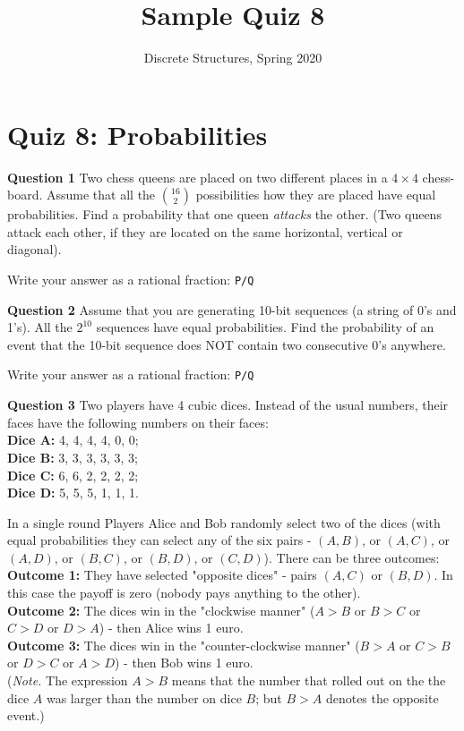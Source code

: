 \documentclass[jou]{apa6}
\title{Sample Quiz 8}
\author{Discrete Structures, Spring 2020}
\affiliation{RBS}
\begin{document}

\twocolumn
\section{Quiz 8: Probabilities}

\vspace{10pt}
{\bf Question 1} 
Two chess queens are placed on two different places in a $4 \times 4$ chess-board.
Assume that all the ${16 \choose 2}$ possibilities how they are placed have equal probabilities.
Find a probability that one queen {\em attacks} the other. (Two queens attack each other, if
they are located on the same horizontal, vertical or diagonal).

Write your answer as a rational fraction: {\tt P/Q}

\vspace{10pt}
{\bf Question 2} Assume that you are generating 10-bit sequences (a string of 0's and 1's). 
All the $2^{10}$ sequences have equal probabilities. 
Find the probability of an event that the 10-bit sequence does NOT contain two consecutive 0's anywhere.

Write your answer as a rational fraction: {\tt P/Q}

\vspace{10pt}
{\bf Question 3}
Two players have 4 cubic dices. Instead of the usual numbers, their faces have the following numbers on their faces:\\
{\bf Dice A:} 4, 4, 4, 4, 0, 0;\\
{\bf Dice B:} 3, 3, 3, 3, 3, 3;\\
{\bf Dice C:} 6, 6, 2, 2, 2, 2;\\
{\bf Dice D:} 5, 5, 5, 1, 1, 1.

In a single round Players Alice and Bob randomly select two of the dices (with equal probabilities they can 
select any of the six pairs - $(A,B)$, or $(A,C)$, or $(A,D)$, or $(B,C)$, or $(B,D)$, or $(C,D)$).
There can be three outcomes:\\
{\bf Outcome 1:} They have selected "opposite dices" - pairs $(A,C)$ or $(B,D)$. In this case the payoff
is zero (nobody pays anything to the other).\\
{\bf Outcome 2:} The dices win in the "clockwise manner" ($A>B$ or $B>C$ or $C>D$ or $D>A$) - then Alice
wins 1 euro.\\
{\bf Outcome 3:} The dices win in the "counter-clockwise manner" ($B>A$ or $C>B$ or $D>C$ or $A>D$) - then Bob
wins 1 euro.\\
({\em Note.} The expression $A>B$ means that the number that rolled out on the the dice $A$ was larger than the number on dice $B$; 
but $B>A$ denotes the opposite event.)
\end{document}
